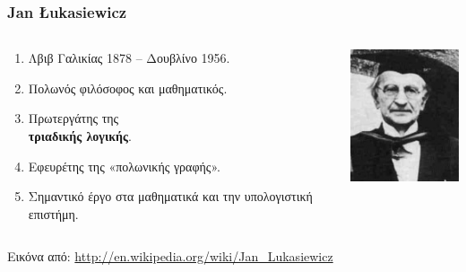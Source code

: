 \begin{frame}[t, fragile]
\frametitle{\en Jan Łukasiewicz}
  \begin{columns}[T]
    \begin{column}{0.6\textwidth}
        \begin{enumerate}
          \item Λβιβ Γαλικίας 1878 -- Δουβλίνο 1956.
          \item Πολωνός φιλόσοφος και μαθηματικός.
          \item Πρωτεργάτης της \\ {\bf\large\color{red}  τριαδικής λογικής}.
          \item Εφευρέτης της «πολωνικής γραφής».                 
          \item Σημαντικό έργο στα μαθηματικά και την υπολογιστική επιστήμη. 
        \end{enumerate}
    \end{column}
    \begin{column}{0.4\textwidth}
      \includegraphics[scale=0.8]{Lukasiewicz.jpg}
    \end{column}
  \end{columns}
  \bigskip
\tiny Εικόνα από: {\en \url{http://en.wikipedia.org/wiki/Jan_Lukasiewicz} }  
\end{frame}



